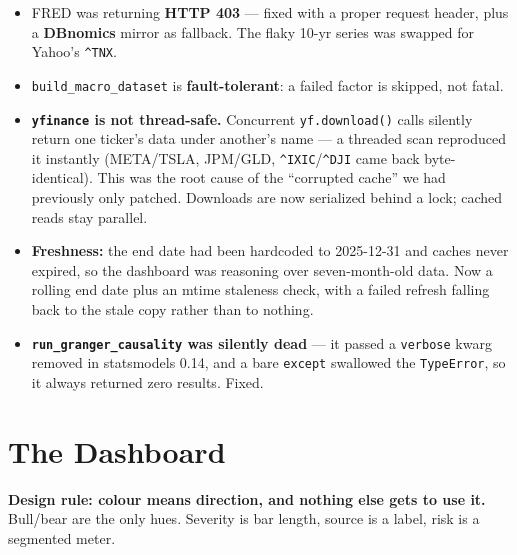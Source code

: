 \documentclass[11pt]{article}
\newcommand{\tk}[1]{\texttt{#1}}
\begin{document}
\begin{itemize}
\item FRED was returning \textbf{HTTP 403} — fixed with a proper request header, plus
a \textbf{DBnomics} mirror as fallback. The flaky 10-yr series was swapped for Yahoo's
\tk{\textasciicircum{}TNX}.
\item \tk{build\_macro\_dataset} is \textbf{fault-tolerant}: a failed factor is
skipped, not fatal.
\item \textbf{\tk{yfinance} is not thread-safe.} Concurrent \tk{yf.download()} calls
silently return one ticker's data under another's name — a threaded scan reproduced it
instantly (META/TSLA, JPM/GLD, \tk{\textasciicircum{}IXIC}/\tk{\textasciicircum{}DJI}
came back byte-identical). This was the root cause of the ``corrupted cache'' we had
previously only patched. Downloads are now serialized behind a lock; cached reads stay
parallel.
\item \textbf{Freshness:} the end date had been hardcoded to 2025-12-31 and caches
never expired, so the dashboard was reasoning over seven-month-old data. Now a rolling
end date plus an mtime staleness check, with a failed refresh falling back to the
stale copy rather than to nothing.
\item \textbf{\tk{run\_granger\_causality} was silently dead} — it passed a
\tk{verbose} kwarg removed in statsmodels 0.14, and a bare \tk{except} swallowed the
\tk{TypeError}, so it always returned zero results. Fixed.
\end{itemize}

\section{The Dashboard}
\begin{goldbox}
\textbf{Design rule: colour means direction, and nothing else gets to use it.}
Bull/bear are the only hues. Severity is bar length, source is a label, risk is a
segmented meter.
\end{goldbox}
\end{document}
